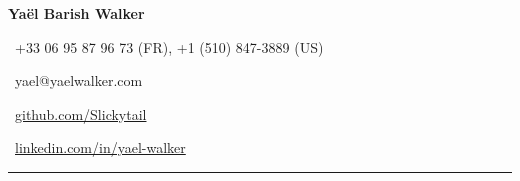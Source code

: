 \documentclass[12pt,letterpaper]{article}
\begin{document}

{\LARGE{\textbf{Yaël Barish Walker}}}\vspace{7pt}

\faPhone \, +33 06 95 87 96 73 (FR), +1 (510) 847-3889 (US)\vspace{4pt}

\faEnvelope \, yael@yaelwalker.com\vspace{4pt}

\faGithub \, \href{https://github.com/Slickytail}{github.com/Slickytail}\vspace{4pt}

\faLinkedinSquare \, \href{https://linkedin.com/in/yael-walker}{linkedin.com/in/yael-walker}\vspace{4pt}


\hrule
\end{document}
